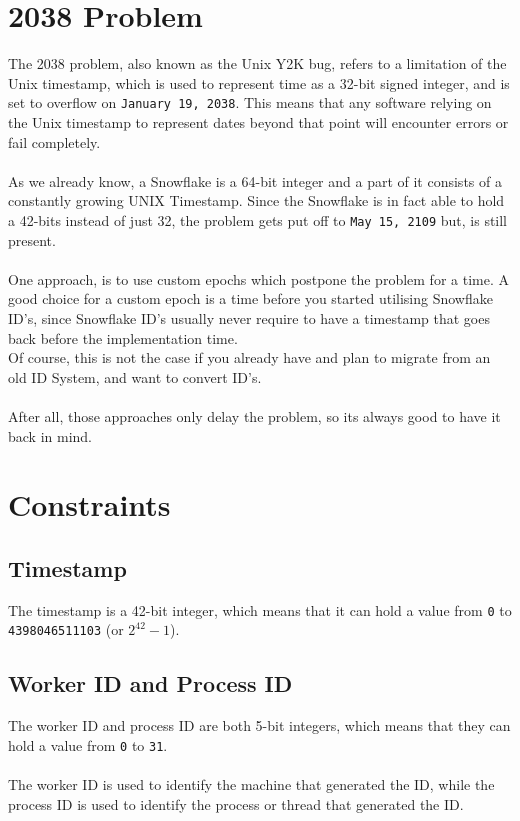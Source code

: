 \documentclass{article}
\newcommand{\code}[1]{\colorbox{cverbbg}{\texttt{#1}}}
\newcommand{\hn}[0]{\hfill \\}
\begin{document}
\section{2038 Problem}
The 2038 problem, also known as the Unix Y2K bug, refers to a limitation of the
Unix timestamp, which is used to represent time as a 32-bit signed integer, and
is set to overflow on \code{January 19, 2038}. This means that any software
relying on the Unix timestamp to represent dates beyond that point will
encounter errors or fail completely. \\
\hn{}
As we already know, a Snowflake is a 64-bit integer and a part of it consists
of a constantly growing UNIX Timestamp. Since the Snowflake is in fact able to
hold a 42-bits instead of just 32, the problem gets put off to \code{May 15,
    2109} but, is still present. \\
\hn{}
One approach, is to use custom epochs which postpone the problem for a time. A
good choice for a custom epoch is a time before you started utilising Snowflake
ID's, since Snowflake ID's usually never require to have a timestamp that goes
back before the implementation time. \\
Of course, this is not the case if you already have and plan to migrate from an
old ID System, and want to convert ID's. \\
\hn{}
After all, those approaches only delay the problem, so its always good to have
it back in mind.

\section{Constraints}

\subsection{Timestamp}
The timestamp is a 42-bit integer, which means that it can hold a value from
\code{0} to \code{4398046511103} (or $2^{42} - 1$).

\subsection{Worker ID and Process ID}
The worker ID and process ID are both 5-bit integers, which means that they
can hold a value from \code{0} to \code{31}. \\
\hn{}
The worker ID is used to identify the machine that generated the ID, while the
process ID is used to identify the process or thread that generated the ID.\@
\end{document}
